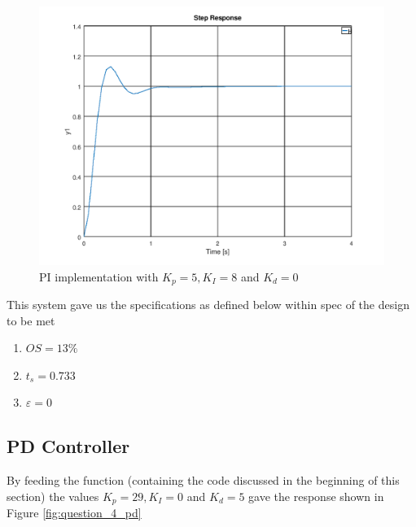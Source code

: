 \documentclass[a4paper, 12pt]{article}
\begin{document}
\begin{figure}[H]
	\centering
	\includegraphics[width=\textwidth]{Images/question_4_PI.png}
	\caption{PI implementation with $K_p = 5, K_I = 8$ and $K_d = 0$}
	\label{fig:question_4_pi}
\end{figure}

This system gave us the specifications as defined below within spec of the design to be met
\begin{enumerate}
	\item $OS = 13\%$
	\item $t_s = 0.733$
	\item $\varepsilon = 0$
\end{enumerate}


\subsection{PD Controller} %
\label{sub:pd_controller}
By feeding the function (containing the code discussed in the beginning of this section) the values $K_p = 29, K_I = 0$ and $K_d = 5$ gave the response shown in Figure \ref{fig:question_4_pd}
\end{document}
